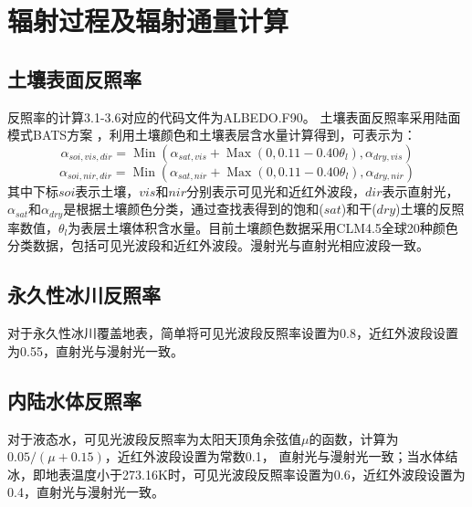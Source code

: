 \chapter{辐射过程及辐射通量计算}
\section{土壤表面反照率}
反照率的计算3.1-3.6对应的代码文件为ALBEDO.F90。
土壤表面反照率采用陆面模式BATS方案 \citep{dickinson1986biosphere,dickinson1993biosphere}，利用土壤颜色和土壤表层含水量计算得到，可表示为：
\begin{equation}
\alpha_{soi,vis,dir}=\operatorname{Min}\left(\alpha_{sat, vis}+\operatorname{Max}\left(0,0.11-0.40 \theta_{l}\right), \alpha_{dry, vis}\right)
\end{equation}
\begin{equation}
\alpha_{soi,nir,dir}=\operatorname{Min}\left(\alpha_{sat, nir}+\operatorname{Max}\left(0,0.11-0.40 \theta_{l}\right), \alpha_{dry, nir}\right)
\end{equation}
其中下标$soi$表示土壤，$vis$和$nir$分别表示可见光和近红外波段，$dir$表示直射光，$\alpha_{sat}$和$\alpha_{d r y}$是根据土壤颜色分类，通过查找表得到的饱和($sat$)和干($dry$)土壤的反照率数值，$\theta_{l}$为表层土壤体积含水量。目前土壤颜色数据采用CLM4.5全球20种颜色分类数据，包括可见光波段和近红外波段。漫射光与直射光相应波段一致。

\section{永久性冰川反照率}
对于永久性冰川覆盖地表，简单将可见光波段反照率设置为0.8，近红外波段设置为0.55，直射光与漫射光一致。


\section{内陆水体反照率}
对于液态水，可见光波段反照率为太阳天顶角余弦值$\mu$的函数，计算为$0.05/(\mu+0.15)$，近红外波段设置为常数0.1，
直射光与漫射光一致；当水体结冰，即地表温度小于273.16K时，可见光波段反照率设置为0.6，近红外波段设置为0.4，直射光与漫射光一致。

